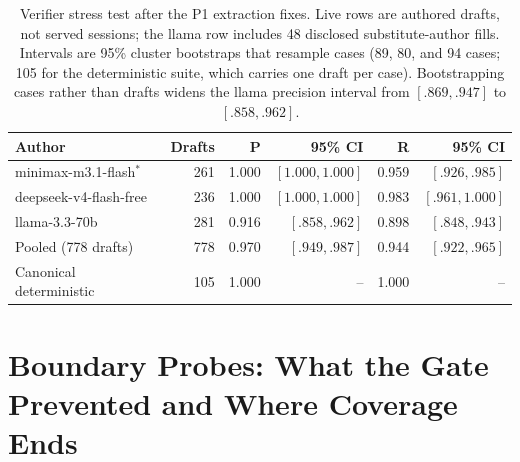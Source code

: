 \begin{table}[t]
\centering
\caption{Verifier stress test after the P1 extraction fixes. Live rows are
authored drafts, not served sessions; the llama row includes 48 disclosed
substitute-author fills. Intervals are 95\% cluster bootstraps that resample
cases (89, 80, and 94 cases; 105 for the deterministic suite, which carries one
draft per case). Bootstrapping cases rather than drafts widens the llama
precision interval from $[.869,.947]$ to $[.858,.962]$.}
\label{tab:verifier-cross-family}
\scriptsize
\setlength{\tabcolsep}{2.5pt}
\begin{tabular}{lrrrrr}
\toprule
Author & Drafts & P & 95\% CI & R & 95\% CI \\
\midrule
minimax-m3.1-flash$^{\ast}$ & 261 & 1.000 & $[1.000,1.000]$ & 0.959 & $[.926,.985]$ \\
deepseek-v4-flash-free & 236 & 1.000 & $[1.000,1.000]$ & 0.983 & $[.961,1.000]$ \\
llama-3.3-70b & 281 & 0.916 & $[.858,.962]$ & 0.898 & $[.848,.943]$ \\
\midrule
Pooled (778 drafts) & 778 & 0.970 & $[.949,.987]$ & 0.944 & $[.922,.965]$ \\
Canonical deterministic & 105 & 1.000 & -- & 1.000 & -- \\
\bottomrule
\end{tabular}
\end{table}

\section{Boundary Probes: What the Gate Prevented and Where Coverage Ends}
\label{app:probes}

